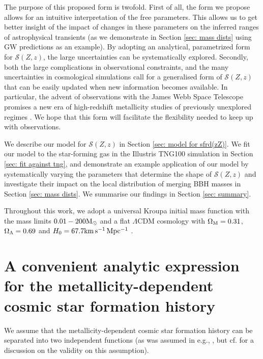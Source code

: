 \documentclass[twocolumn]{aastex631}
\newcommand{\Msun}{\ensuremath{\rm{M}_{\odot}}\xspace}
\newcommand{\SFRDzZ}{\ensuremath{\mathcal{S}(Z,z)}\xspace}
\begin{document}
The purpose of this proposed form is twofold.  
First of all, the form we propose allows for an intuitive interpretation of the free parameters. This allows us to get better insight of the impact of changes in these parameters on the inferred ranges of astrophysical transients (as we demonstrate in Section \ref{sec: mass dists} using GW predictions as an example). By adopting an analytical, parametrized form for \SFRDzZ, the large uncertainties can be systematically explored.
%
Secondly, both the large complications in observational constraints, and the many uncertainties in cosmological simulations call for a generalised form of \SFRDzZ that can be easily updated when new information becomes available. 
In particular, the advent of observations with the James Webb Space Telescope promises a new era of high-redshift
metallicity studies of previously unexplored regimes \citep[e.g.,][]{Sanders+2022}. We hope that this form will facilitate the flexibility needed to keep up with observations. 


We describe our model for \SFRDzZ in Section \ref{sec: model for sfrd(zZ)}.
We fit our model to the star-forming gas in the Illustris TNG100 simulation in Section \ref{sec: fit against tng}, and demonstrate an example application of our model by systematically varying the parameters that determine the shape of \SFRDzZ and investigate their impact on the local distribution of merging BBH masses in Section \ref{sec: mass dists}.
We summarise our findings in Section \ref{sec: summary}.

Throughout this work, we adopt a universal Kroupa initial mass function \citep{Kroupa2001} with the mass
limits $0.01 - 200\Msun$ and a flat $\Lambda$CDM cosmology with $\Omega_{\rm{M}}=0.31$, $\Omega_{\rm{\Lambda}}=0.69$ and $H_0=67.7\rm{km\,s^{-1}\,Mpc^{-1}}$ \citep{Planck18_VI}.


\section{A convenient analytic expression for the metallicity-dependent cosmic star formation history \label{sec: model for sfrd(zZ)} }
We assume that the metallicity-dependent cosmic star formation history can be separated into two independent functions 
(as was assumed in e.g., \citealt{LangerNorman2006}, but cf. \citealt{chruslinska2022_review} for a discussion on the validity on this assumption).
\end{document}
